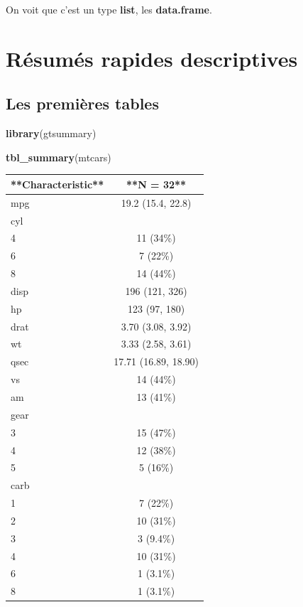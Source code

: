 \documentclass[
]{book}
\newenvironment{Shaded}{\begin{snugshade}}{\end{snugshade}}
\newcommand{\FunctionTok}[1]{\textcolor[rgb]{0.13,0.29,0.53}{\textbf{#1}}}
\newcommand{\NormalTok}[1]{#1}
\begin{document}
On voit que c'est un type \textbf{list}, les \textbf{data.frame}.

\hypertarget{ruxe9sumuxe9s-rapides-descriptives}{%
\chapter{Résumés rapides descriptives}\label{ruxe9sumuxe9s-rapides-descriptives}}

\hypertarget{les-premiuxe8res-tables}{%
\section{Les premières tables}\label{les-premiuxe8res-tables}}

\begin{Shaded}
\begin{Highlighting}[]
\FunctionTok{library}\NormalTok{(gtsummary)}
\end{Highlighting}
\end{Shaded}

\begin{Shaded}
\begin{Highlighting}[]
\FunctionTok{tbl\_summary}\NormalTok{(mtcars)}
\end{Highlighting}
\end{Shaded}

\begin{tabular}{l|c}
\hline
**Characteristic** & **N = 32**\\
\hline
mpg & 19.2 (15.4, 22.8)\\
\hline
cyl & \\
\hline
4 & 11 (34\%)\\
\hline
6 & 7 (22\%)\\
\hline
8 & 14 (44\%)\\
\hline
disp & 196 (121, 326)\\
\hline
hp & 123 (97, 180)\\
\hline
drat & 3.70 (3.08, 3.92)\\
\hline
wt & 3.33 (2.58, 3.61)\\
\hline
qsec & 17.71 (16.89, 18.90)\\
\hline
vs & 14 (44\%)\\
\hline
am & 13 (41\%)\\
\hline
gear & \\
\hline
3 & 15 (47\%)\\
\hline
4 & 12 (38\%)\\
\hline
5 & 5 (16\%)\\
\hline
carb & \\
\hline
1 & 7 (22\%)\\
\hline
2 & 10 (31\%)\\
\hline
3 & 3 (9.4\%)\\
\hline
4 & 10 (31\%)\\
\hline
6 & 1 (3.1\%)\\
\hline
8 & 1 (3.1\%)\\
\hline
\end{tabular}
\end{document}
